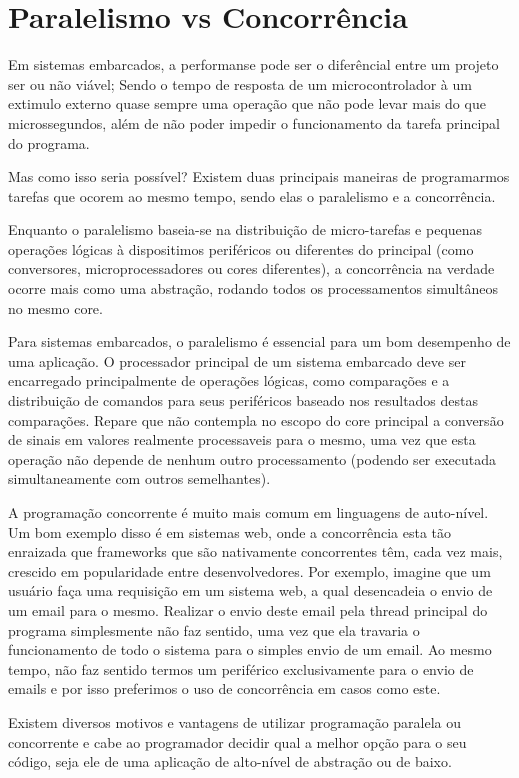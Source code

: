 \documentclass[11pt]{article}
\begin{document}
\section{Paralelismo vs Concorrência}
\label{sec:orgheadline13}
Em sistemas embarcados, a performanse pode ser o diferêncial entre um projeto
ser ou não viável; Sendo o tempo de resposta de um microcontrolador à um
extimulo externo quase sempre uma operação que não pode levar mais do que
microssegundos, além de não poder impedir o funcionamento da tarefa principal
do programa.

Mas como isso seria possível? Existem duas principais maneiras de programarmos
tarefas que ocorem ao mesmo tempo, sendo elas o paralelismo e a concorrência.

Enquanto o paralelismo baseia-se na distribuição de micro-tarefas e pequenas
operações lógicas à dispositimos periféricos ou diferentes do principal (como conversores,
microprocessadores ou cores diferentes), a concorrência na verdade ocorre mais
como uma abstração, rodando todos os processamentos simultâneos no mesmo core.

Para sistemas embarcados, o paralelismo é essencial para um bom desempenho de
uma aplicação. O processador principal de um sistema embarcado deve ser
encarregado principalmente de operações lógicas, como comparações e a
distribuição de comandos para seus periféricos baseado nos resultados destas
comparações. Repare que não contempla no escopo do core principal a conversão
de sinais em valores realmente processaveis para o mesmo, uma vez que esta
operação não depende de nenhum outro processamento (podendo ser executada
simultaneamente com outros semelhantes).

A programação concorrente é muito mais comum em linguagens de auto-nível. Um
bom exemplo disso é em sistemas web, onde a concorrência esta tão enraizada
que frameworks que são nativamente concorrentes têm, cada vez mais, crescido em
popularidade entre desenvolvedores. Por exemplo, imagine que um usuário faça uma
requisição em um sistema web, a qual desencadeia o envio de um email para o
mesmo. Realizar o envio deste email pela thread principal do programa
simplesmente não faz sentido, uma vez que ela travaria o funcionamento de todo o
sistema para o simples envio de um email. Ao mesmo tempo, não faz sentido termos
um periférico exclusivamente para o envio de emails e por isso preferimos o
uso de concorrência em casos como este.

Existem diversos motivos e vantagens de utilizar programação paralela ou
concorrente e cabe ao programador decidir qual a melhor opção para o seu código,
seja ele de uma aplicação de alto-nível de abstração ou de baixo.
\end{document}
